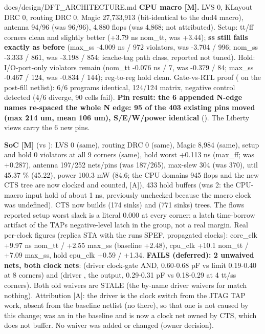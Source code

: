\begin{relocated}{docs/design/DFT_ARCHITECTURE.md}
\textbf{CPU macro {[}M{]}.} LVS 0, KLayout DRC 0, routing DRC 0, Magic
27,733,913 (bit-identical to the dud4 macro), antenna 94/96 (was 96/96),
4,880 flops (was 4,868; not attributed). Setup: tt/ff corners clean and
slightly better (+3.79 ns nom\_tt, was +3.44); \textbf{ss still fails
exactly as before} (max\_ss -4.009 ns / 972 violators, was -3.704 / 996;
nom\_ss -3.333 / 861, was -3.198 / 854; icache-tag path class, reported
not tuned). Hold: I/\allowbreak{}O-port-only violators remain (nom\_tt
-0.076 ns / 7, was -0.379 / 84; max\_ss -0.467 / 124, was -0.834 / 144);
reg-to-reg hold clean. Gate-vs-RTL proof
( on the post-fill
netlist): 6/6 programs identical, 124/124 matrix, negative control
detected (4/6 diverge, 90 cells fail). \textbf{Pin result: the 6
appended N-edge names re-spaced the whole N edge: 95 of the 403 existing
pins moved (max 214 um, mean 106 um),
S/\allowbreak{}E/\allowbreak{}W/\allowbreak{}power identical}
(). The Liberty views carry the 6 new pins.

\textbf{SoC {[}M{]}} (vs ): LVS 0 (same),
routing DRC 0 (same), Magic 8,984 (same), setup and hold 0 violators at
all 9 corners (same), hold worst +0.113 ns (max\_ff; was +0.287),
antenna 197/252 nets/pins (was 187/265), max-slew 304 (was 370), util
45.37 \% (45.22), power 100.3 mW (84.6; the CPU domain\textquotesingle s
945 flops and the new CTS tree are now clocked and counted, {[}A{]}),
433 hold buffers (was 2: the CPU-macro input hold of about 1 ns,
previously unchecked because the macro clock was undefined). CTS now
builds  (174 sinks) and 
(771 sinks) trees. The flow\textquotesingle s reported setup worst slack
is a literal 0.000 at every corner: a latch time-borrow artifact of the
TAP\textquotesingle s negative-level latch in the  group, not
a real margin. Real per-clock figures (replica STA with the
run\textquotesingle s SPEF, propagated clocks): core\_clk +9.97 ns
nom\_tt / +2.55 max\_ss (baseline +2.48), cpu\_clk +10.1 nom\_tt / +7.09
max\_ss, hold cpu\_clk +0.59 / +1.34.
\textbf{ FAILS (deferred): 2 unwaived nets,
both clock nets}:  (driver  clock-gate
AND, 0.60-0.68 pF vs limit 0.19-0.40 at 8 corners) and 
(driver , the  output, 0.29-0.31 pF vs
0.18-0.29 at 4 tt/ss corners). Both old waivers are STALE (the by-name
driver waivers for  match nothing).
Attribution {[}A{]}: the  driver is the clock switch from
the JTAG TAP work, absent from the baseline netlist (no 
there), so that one is not caused by this change; 
was an  in the baseline and is now a clock net owned by
CTS, which  does not buffer. No waiver was added or
changed (owner decision).


\end{relocated}
